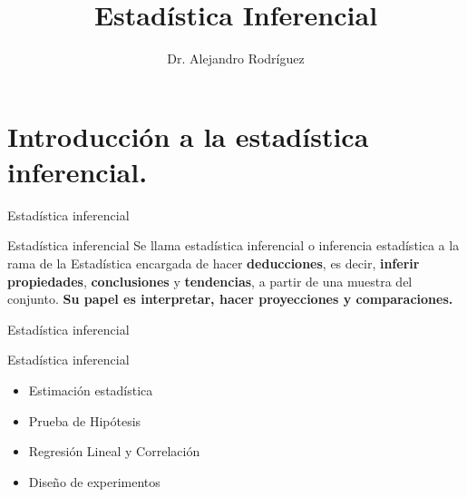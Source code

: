 \documentclass[11pt]{beamer}
\begin{document}
    \author{Dr. Alejandro Rodr\'iguez}
    \title{Estadística Inferencial}
    \begin{frame}[plain]
        \maketitle
    \end{frame}

    \section{Introducción a la estadística inferencial.}
      \begin{frame}{Estadística inferencial}
        \begin{block}{Estadística inferencial}
            Se llama estadística inferencial o inferencia estadística a la rama de la Estadística encargada de hacer \textbf{deducciones}, es decir, \textbf{inferir propiedades}, \textbf{conclusiones} y \textbf{tendencias}, a partir de una muestra del conjunto. \textbf{Su papel es interpretar, hacer proyecciones y comparaciones.}
        \end{block}
      \end{frame}


      \begin{frame}{Estadística inferencial}
          \begin{block}{Estadística inferencial}
              \begin{itemize}
                  \item Estimación estadística
                  \item Prueba de Hipótesis
                  \item Regresión Lineal y Correlación
                  \item Diseño de experimentos
              \end{itemize}
          \end{block}
      \end{frame}
\end{document}
